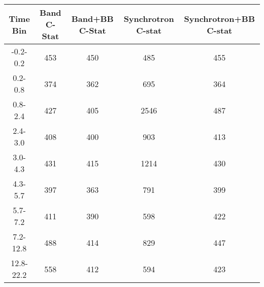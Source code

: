 \begin{table}[h!]

\centering

\begin{tabular}{c | c c c c}



Time Bin & Band C-Stat & Band+BB C-Stat & Synchrotron C-stat & Synchrotron+BB C-stat \\ 

\hline \hline

-0.2-0.2 & 453 & 450 & 485 & 455 \\ 



0.2-0.8 & 374 & 362 & 695 & 364 \\ 



0.8-2.4 & 427 & 405 & 2546 & 487 \\ 



2.4-3.0 & 408 & 400 & 903 & 413 \\ 



3.0-4.3 & 431 & 415 & 1214 & 430 \\ 



4.3-5.7 & 397 & 363 & 791 & 399 \\ 



5.7-7.2 & 411 & 390 & 598 & 422 \\ 



7.2-12.8 & 488 & 414 & 829 & 447 \\ 



12.8-22.2 & 558 & 412 & 594 & 423 \\ 





\end{tabular}




\end{table}

